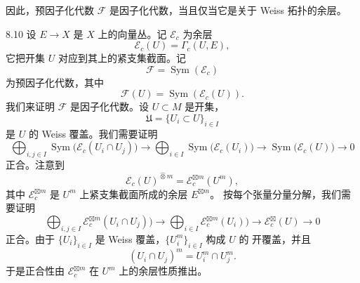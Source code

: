 因此，预因子化代数 $\mathcal{F}$ 是因子化代数，当且仅当它是关于 Weiss 拓扑的余层。


\begin{wexam}{8.10}
  设 $E\to X$ 是 $X$ 上的向量丛。记 $\mathcal{E}_c$ 为余层
  \[
    \mathcal{E}_c(U)=\Gamma_c(U,E),
  \]
  它把开集 $U$ 对应到其上的紧支集截面。记
  \[
    \mathcal{F}=\operatorname{Sym}(\mathcal{E}_c)
  \]
  为预因子化代数，其中
  \[
    \mathcal{F}(U)=\operatorname{Sym}(\mathcal{E}_c(U)).
  \]
  我们来证明 $\mathcal{F}$ 是因子化代数。设 $U\subset M$ 是开集，
  \[
    \mathfrak{U}=\{U_i\subset U\}_{i\in I}
  \]
  是 $U$ 的 Weiss 覆盖。我们需要证明
  \[
    \bigoplus_{i,j\in I}\operatorname{Sym}\big(\mathcal{E}_c(U_i\cap U_j)\big)
    \longrightarrow
    \bigoplus_{i\in I}\operatorname{Sym}\big(\mathcal{E}_c(U_i)\big)
    \longrightarrow
    \operatorname{Sym}\big(\mathcal{E}_c(U)\big)
    \longrightarrow 0
  \]
  正合。注意到
  \[
    \mathcal{E}_c(U)^{\hat\otimes m}=\mathcal{E}_c^{\boxtimes m}(U^{m}),
  \]
  其中 $\mathcal{E}_c^{\boxtimes m}$ 是 $U^{m}$ 上紧支集截面所成的余层 $E^{\boxtimes m}$。
  按每个张量分量分解，我们需要证明
  \[
    \bigoplus_{i,j\in I}\mathcal{E}_c^{\boxtimes m}(U_i\cap U_j))
    \longrightarrow
    \bigoplus_{i\in I}\mathcal{E}_c^{\boxtimes m}(U_i))
    \longrightarrow
    \mathcal{E}_c^{\boxtimes}(U)
    \longrightarrow 0
  \]
  正合。由于 $\{U_i\}_{i\in I}$ 是 Weiss 覆盖，$\{U_i^{m}\}_{i\in I}$ 构成 $U$ 的
  开覆盖，并且
  \[
    (U_i\cap U_j)^{m}=U_i^{m}\cap U_j^{m}.
  \]
  于是正合性由 $\mathcal{E}_c^{\boxtimes m}$ 在 $U^{m}$ 上的余层性质推出。
\end{wexam}


